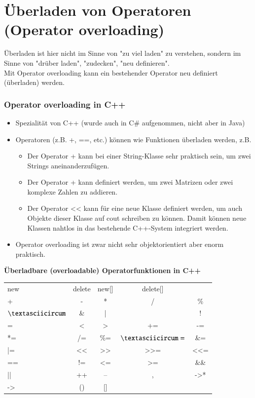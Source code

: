 
\part{Überladen von Operatoren (Operator overloading)}
Überladen ist hier nicht im Sinne von "zu viel laden" zu verstehen, sondern im Sinne von "drüber laden", "zudecken", "neu definieren".\\
Mit Operator overloading kann ein bestehender Operator neu definiert (überladen) werden.

\section{Operator overloading in C++}
\begin{itemize}
	\item Spezialität von C++ (wurde auch in C\# aufgenommen, nicht aber in Java)
	\item Operatoren (z.B. +, ==, etc.) können wie Funktionen überladen werden, z.B.
	\begin{itemize}
		\item Der Operator + kann bei einer String-Klasse sehr praktisch sein, um zwei Strings aneinanderzufügen.
		\item Der Operator + kann definiert werden, um zwei Matrizen oder zwei komplexe Zahlen zu addieren.
		\item Der Operator << kann für eine neue Klasse definiert werden, um auch Objekte dieser Klasse auf cout schreiben zu können. Damit können neue Klassen nahtlos in das bestehende C++-System integriert werden.
	\end{itemize}
	\item Operator overloading ist zwar nicht sehr objektorientiert aber enorm praktisch.
\end{itemize}
\vspace{\baselineskip}
\textbf{Überladbare (overloadable) Operatorfunktionen in C++}\\
\vspace{\baselineskip}
\begin{tabular}{|l|c|c|c|c|}
	\hline 
	new & delete & new[] & delete[] &  \\ 
	+ & - & * & / & \% \\ 
	\hline 
	$\textasciicircum$ & \& & | & ~ & ! \\ 
	\hline 
	= & < & > & += & -= \\ 
	\hline 
	*= & /= & \%= & $\textasciicircum=$ & \&= \\ 
	\hline 
	|= & << & >> & >>= & <<= \\ 
	\hline 
	== & != & <= & >= & \&\& \\ 
	\hline 
	|| & ++ & -- & , & ->* \\ 
	\hline 
	-> & () & [] &  &  \\ 
	\hline 
\end{tabular}

